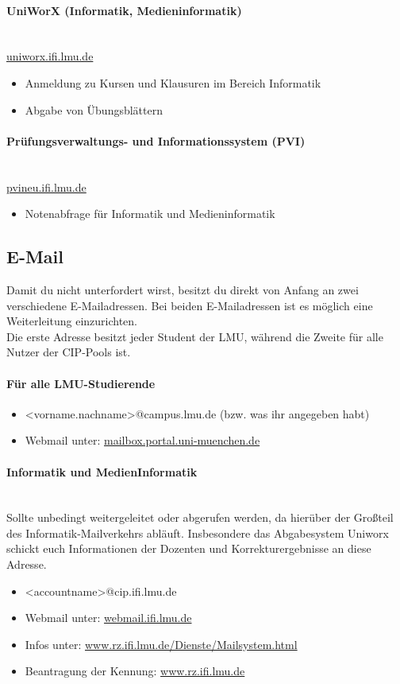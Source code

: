\paragraph{UniWorX (Informatik, Medieninformatik)}\hfill\\
\url{uniworx.ifi.lmu.de}
\begin{itemize}
	\item Anmeldung zu Kursen und Klausuren im Bereich Informatik
	\item Abgabe von Übungsblättern
\end{itemize}

\paragraph{Prüfungsverwaltungs- und Informationssystem (PVI)}\hfill\\
\url{pvineu.ifi.lmu.de}
\begin{itemize}
	\item Notenabfrage für Informatik und Medieninformatik
\end{itemize}

\clearpage

\subsection{E-Mail}
Damit du nicht unterfordert wirst, besitzt du direkt von Anfang an zwei verschiedene E-Mailadressen. Bei beiden E-Mailadressen ist es möglich eine Weiterleitung einzurichten.\\

Die erste Adresse besitzt jeder Student der LMU, während die Zweite für alle Nutzer der CIP-Pools ist.

\paragraph{Für alle LMU-Studierende}
\begin{itemize}
	\item <vorname.nachname>@campus.lmu.de (bzw. was ihr angegeben habt)
	\item Webmail unter: \url{mailbox.portal.uni-muenchen.de}
\end{itemize}

\paragraph{Informatik und MedienInformatik}\hfill\\
Sollte unbedingt weitergeleitet oder abgerufen werden, da hierüber der Großteil des Informatik-Mailverkehrs abläuft. Insbesondere das Abgabesystem Uniworx schickt euch Informationen der Dozenten und Korrekturergebnisse an diese Adresse.
\begin{itemize}
	\item <accountname>@cip.ifi.lmu.de
	\item Webmail unter: \url{webmail.ifi.lmu.de}
	\item Infos unter: \url{www.rz.ifi.lmu.de/Dienste/Mailsystem.html}
	\item Beantragung der Kennung: \url{www.rz.ifi.lmu.de}
\end{itemize}


